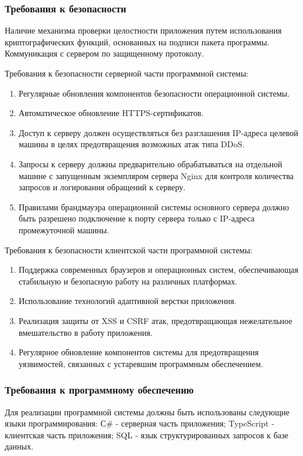 \subsubsection{Требования к безопасности}
Наличие механизма проверки целостности приложения путем использования криптографических функций, основанных на подписи пакета программы. Коммуникация с сервером по защищенному протоколу.

Требования к безопасности серверной части программной системы:
\begin{enumerate}
\item Регулярные обновления компонентов безопасности операционной системы.
\item Автоматическое обновление HTTPS-сертификатов.
\item Доступ к серверу должен осуществляться без разглашения IP-адреса целевой машины в целях предотвращения возможных атак типа DDoS.
\item Запросы к серверу должны предварительно обрабатываться на отдельной машине с запущенным экземпляром сервера Nginx для контроля количества запросов и логирования обращений к серверу.
\item Правилами брандмауэра операционной системы основного сервера должно быть разрешено подключение к порту сервера только с IP-адреса промежуточной машины.
\end{enumerate}

Требования к безопасности клиентской части программной системы:
\begin{enumerate}
\item Поддержка современных браузеров и операционных систем, обеспечивающая стабильную и безопасную работу на различных платформах.
\item Использование технологий адаптивной верстки приложения.
\item Реализация защиты от XSS и CSRF атак, предотвращающая нежелательное вмешательство в работу приложения.
\item Регулярное обновление компонентов системы для предотвращения уязвимостей, связанных с устаревшим программным обеспечением.
\end{enumerate}

\subsubsection{Требования к программному обеспечению}
Для реализации программной системы должны быть использованы следующие языки программирования:
С\# -\- серверная часть приложения;
TypeScript -\- клиентская часть приложения;
SQL -\- язык структурированных запросов к базе данных.


